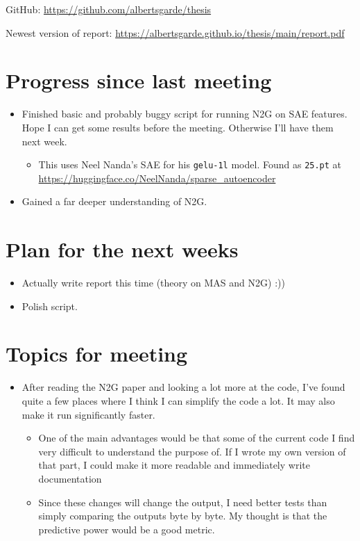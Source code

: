 \documentclass[main.tex]{subfiles}
\begin{document}
GitHub: \url{https://github.com/albertsgarde/thesis}

Newest version of report: \url{https://albertsgarde.github.io/thesis/main/report.pdf}


\section*{Progress since last meeting}
\begin{itemize}
    \item Finished basic and probably buggy script for running N2G on SAE features. Hope I can get some results before the meeting. Otherwise I'll have them next week.
    \begin{itemize}
        \item This uses Neel Nanda's SAE for his \verb|gelu-1l| model. Found as \verb|25.pt| at \url{https://huggingface.co/NeelNanda/sparse_autoencoder}
    \end{itemize}
    \item Gained a far deeper understanding of N2G.
\end{itemize}
\section*{Plan for the next weeks}
\begin{itemize}
    \item Actually write report this time (theory on MAS and N2G) :))
    \item Polish script.
\end{itemize}
\section*{Topics for meeting}
\begin{itemize}
    \item After reading the N2G paper and looking a lot more at the code, I've found quite a few places where I think I can simplify the code a lot. It may also make it run significantly faster.
    \begin{itemize}
        \item One of the main advantages would be that some of the current code I find very difficult to understand the purpose of. If I wrote my own version of that part, I could make it more readable and immediately write documentation
        \item Since these changes will change the output, I need better tests than simply comparing the outputs byte by byte. My thought is that the predictive power would be a good metric.
    \end{itemize}
\end{itemize}
\end{document}
